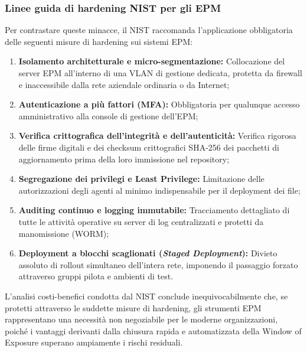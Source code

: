\documentclass[../../main.tex]{subfiles}
\begin{document}
\subsubsection{Linee guida di hardening NIST per gli EPM}
Per contrastare queste minacce, il NIST raccomanda l'applicazione obbligatoria delle seguenti misure di hardening sui sistemi EPM:
\begin{enumerate}
    \item \textbf{Isolamento architetturale e micro-segmentazione:} Collocazione del server EPM all'interno di una VLAN di gestione dedicata, protetta da firewall e inaccessibile dalla rete aziendale ordinaria o da Internet;
    \item \textbf{Autenticazione a più fattori (MFA):} Obbligatoria per qualunque accesso amministrativo alla console di gestione dell'EPM;
    \item \textbf{Verifica crittografica dell'integrità e dell'autenticità:} Verifica rigorosa delle firme digitali e dei checksum crittografici SHA-256 dei pacchetti di aggiornamento prima della loro immissione nel repository;
    \item \textbf{Segregazione dei privilegi e Least Privilege:} Limitazione delle autorizzazioni degli agenti al minimo indispensabile per il deployment dei file;
    \item \textbf{Auditing continuo e logging immutabile:} Tracciamento dettagliato di tutte le attività operative su server di log centralizzati e protetti da manomissione (WORM);
    \item \textbf{Deployment a blocchi scaglionati (\textit{Staged Deployment}):} Divieto assoluto di rollout simultaneo dell'intera rete, imponendo il passaggio forzato attraverso gruppi pilota e ambienti di test.
\end{enumerate}

L'analisi costi-benefici condotta dal NIST conclude inequivocabilmente che, se protetti attraverso le suddette misure di hardening, gli strumenti EPM rappresentano una necessità non negoziabile per le moderne organizzazioni, poiché i vantaggi derivanti dalla chiusura rapida e automatizzata della Window of Exposure superano ampiamente i rischi residuali.
\end{document}
